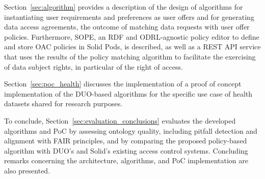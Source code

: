 Section~\ref{sec:algorithm} provides a description of the design of algorithms for instantiating user requirements and preferences as user offers and for generating data access agreements, the outcome of matching data requests with user offer policies.
Furthermore, SOPE, an RDF and ODRL-agnostic policy editor to define and store OAC policies in Solid Pods, is described, as well as a REST API service that uses the results of the policy matching algorithm to facilitate the exercising of data subject rights, in particular of the right of access.

Section~\ref{sec:poc_health} discusses the implementation of a proof of concept implementation of the DUO-based algorithms for the specific use case of health datasets shared for research purposes.

To conclude, Section~\ref{sec:evaluation_conclusions} evaluates the developed algorithms and PoC by assessing ontology quality, including pitfall detection and alignment with FAIR principles, and by comparing the proposed policy-based algorithm with DUO's and Solid's existing access control systems.
Concluding remarks concerning the architecture, algorithms, and PoC implementation are also presented.




